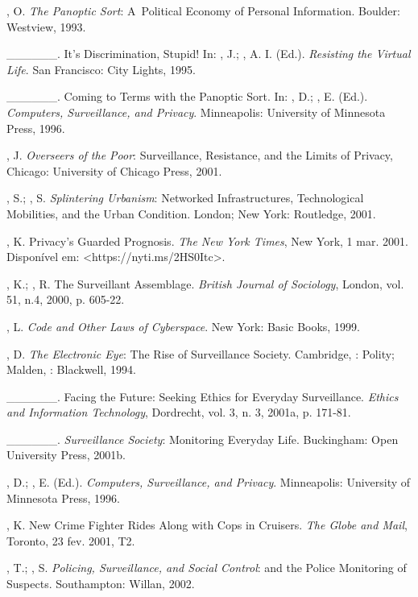 \begin{Parskip}
, O. \emph{The Panoptic Sort}: A~Political Economy of Personal
Information.  Boulder: Westview, 1993.

\_\_\_\_\_\_. It's Discrimination, Stupid! In: , J.; , A. I.
(Ed.). \emph{Resisting the Virtual Life}. San Francisco: City Lights,
1995.

\_\_\_\_\_\_. Coming to Terms with the Panoptic Sort. In: , D.;
, E. (Ed.). \emph{Computers, Surveillance, and Privacy}.
Minneapolis: University of Minnesota Press, 1996.

, J. \emph{Overseers of the Poor}: Surveillance, Resistance, and
the Limits of Privacy, Chicago: University of Chicago Press, 2001.

, S.; , S. \emph{Splintering Urbanism}: Networked
Infrastructures, Technological Mobilities, and the Urban Condition.
London; New York: Routledge, 2001.

, K. Privacy's Guarded Prognosis. \emph{The New York Times}, New
York, 1 mar. 2001. Disponível em:
\textless{}https://nyti.ms/2HS0Itc\textgreater{}.

, K.; , R. The Surveillant Assemblage. \emph{British
Journal of Sociology}, London, vol. 51, n.4, 2000, p. 605-22.

, L. \emph{Code and Other Laws of Cyberspace}. New York: Basic
Books, 1999.

, D. \emph{The Electronic Eye}: The Rise of Surveillance Society.
Cambridge, : Polity; Malden, : Blackwell, 1994.

\_\_\_\_\_\_. Facing the Future: Seeking Ethics for Everyday
Surveillance. \emph{Ethics and Information Technology}, Dordrecht, vol.
3, n. 3, 2001a, p. 171-81.

\_\_\_\_\_\_. \emph{Surveillance Society}: Monitoring Everyday Life.
Buckingham: Open University Press, 2001b.

, D.; , E. (Ed.). \emph{Computers, Surveillance, and Privacy}.
Minneapolis: University of Minnesota Press, 1996.

, K. New Crime Fighter Rides Along with Cops in Cruisers.
\emph{The Globe and Mail}, Toronto, 23 fev. 2001, T2.

, T.; , S. \emph{Policing, Surveillance, and Social
Control}:  and the Police Monitoring of Suspects. Southampton:
Willan, 2002.


\end{Parskip}
